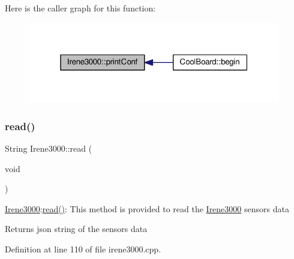 Here is the caller graph for this function\+:\nopagebreak
\begin{figure}[H]
\begin{center}
\leavevmode
\includegraphics[width=313pt]{d6/d03/class_irene3000_a7bc2414100b5e19eacc6630fa34b2654_icgraph}
\end{center}
\end{figure}
\mbox{\label{class_irene3000_a852a170feea994ea1df01c6b245b5d9a}} 
\subsubsection{\texorpdfstring{read()}{read()}}
{\footnotesize\ttfamily String Irene3000\+::read (\begin{DoxyParamCaption}\item[{void}]{ }\end{DoxyParamCaption})}

\hyperlink{class_irene3000}{Irene3000}\+:\hyperlink{class_irene3000_a852a170feea994ea1df01c6b245b5d9a}{read()}\+: This method is provided to read the \hyperlink{class_irene3000}{Irene3000} sensors data

\begin{DoxyReturn}{Returns}
json string of the sensors data 
\end{DoxyReturn}


Definition at line 110 of file irene3000.\+cpp.


